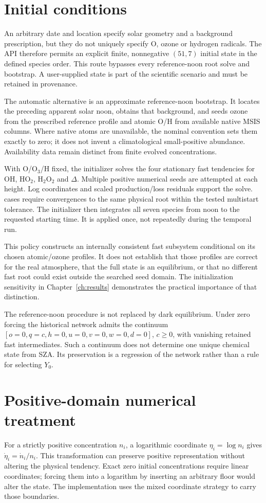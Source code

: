 \section{Initial conditions}
An arbitrary date and location specify solar geometry and a background prescription, but they do not uniquely specify O, ozone or hydrogen radicals. The API therefore permits an explicit finite, nonnegative $(51,7)$ initial state in the defined species order. This route bypasses every reference-noon root solve and bootstrap. A user-supplied state is part of the scientific scenario and must be retained in provenance.

The automatic alternative is an approximate reference-noon bootstrap. It locates the preceding apparent solar noon, obtains that background, and seeds ozone from the prescribed reference profile and atomic O/H from available native MSIS columns. Where native atoms are unavailable, the nominal convention sets them exactly to zero; it does not invent a climatological small-positive abundance. Availability data remain distinct from finite evolved concentrations.

With O/O$_3$/H fixed, the initializer solves the four stationary fast tendencies for OH, HO$_2$, H$_2$O$_2$ and $\Delta$. Multiple positive numerical seeds are attempted at each height. Log coordinates and scaled production/loss residuals support the solve. cases require convergences to the same physical root within the tested multistart tolerance. The initializer then integrates all seven species from noon to the requested starting time. It is applied once, not repeatedly during the temporal run.

This policy constructs an internally consistent fast subsystem conditional on its chosen atomic/ozone profiles. It does not establish that those profiles are correct for the real atmosphere, that the full state is an equilibrium, or that no different fast root could exist outside the searched seed domain. The initialization sensitivity in Chapter~\ref{ch:results} demonstrates the practical importance of that distinction.

The reference-noon procedure is not replaced by dark equilibrium. Under zero forcing the historical network admits the continuum $[o=0,q=c,h=0,u=0,v=0,w=0,d=0]$, $c\geq0$, with vanishing retained fast intermediates. Such a continuum does not determine one unique chemical state from SZA. Its preservation is a regression of the network rather than a rule for selecting $Y_0$.

\section{Positive-domain numerical treatment}
For a strictly positive concentration $n_i$, a logarithmic coordinate $\eta_i=\log n_i$ gives $\dot\eta_i=\dot n_i/n_i$. This transformation can preserve positive representation without altering the physical tendency. Exact zero initial concentrations require linear coordinates; forcing them into a logarithm by inserting an arbitrary floor would alter the state. The implementation uses the mixed coordinate strategy to carry those boundaries.

